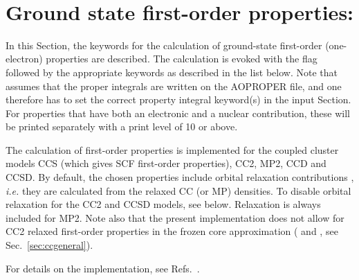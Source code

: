 ~%
\section{Ground state first-order properties: }
\label{sec:ccfop}

In this Section, the keywords for the calculation of ground-state first-order
(one-electron) properties are described. The calculation
is evoked with the  flag followed by the appropriate
keywords as described in the list below. Note that 
assumes that the proper integrals are written on the
AOPROPER file, and one therefore has to set the correct property
integral keyword(s) in the  input Section. For properties
that have both an electronic and a nuclear contribution, these will
be printed separately with a print level of 10 or above.

The calculation of first-order properties is implemented for the 
coupled cluster models CCS (which gives SCF first-order properties),
CC2, MP2, CCD and CCSD.  
By default, the chosen properties include orbital relaxation
contributions ,
{\it i.e.\/} they are calculated from the relaxed CC (or MP) densities. 
To disable orbital relaxation for the CC2 and CCSD models, 
see  below. Relaxation is always included for MP2. 
Note also that the present implementation does not allow for 
CC2 relaxed first-order
properties in the frozen core approximation 
( and , see Sec.~\ref{sec:ccgeneral}).

For details on the implementation, see 
Refs.~\cite{Halkier:CCFOP,Halkier:CC2RLXFOP}.

\begin{center}
\end{center}

